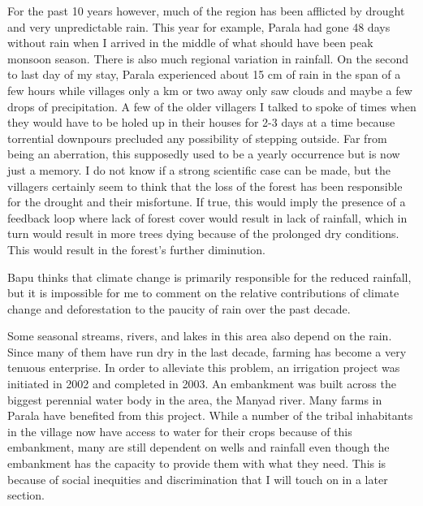 \documentclass{report}
\begin{document}
For the past 10 years however, much of the region has been afflicted by drought and very unpredictable rain. This year for example, Parala had gone 48 days without rain when I arrived in the middle of what should have been peak monsoon season. There is also much regional variation in rainfall. On the second to last day of my stay, Parala experienced about 15 cm of rain in the span of a few hours while villages only a km or two away only saw clouds and maybe a few drops of precipitation. A few of the older villagers I talked to spoke of times when they would have to be holed up in their houses for 2-3 days at a time because torrential downpours precluded any possibility of stepping outside. Far from being an aberration, this supposedly used to be a yearly occurrence but is now just a memory. I do not know if a strong scientific case can be made, but the villagers certainly seem to think that the loss of the forest has been responsible for the drought and their misfortune. If true, this would imply the presence of a feedback loop where lack of forest cover would result in lack of rainfall, which in turn would result in more trees dying because of the prolonged dry conditions. This would result in the forest's further diminution.

Bapu thinks that climate change is primarily responsible for the reduced rainfall, but it is impossible for me to comment on the relative contributions of climate change and deforestation to the paucity of rain over the past decade.

Some seasonal streams, rivers, and lakes in this area also depend on the rain. Since many of them have run dry in the last decade, farming has become a very tenuous enterprise. In order to alleviate this problem, an irrigation project was initiated in 2002 and completed in 2003. An embankment was built across the biggest perennial water body in the area, the Manyad river. Many farms in Parala have benefited from this project. While a number of the tribal inhabitants in the village now have access to water for their crops because of this embankment, many are still dependent on wells and rainfall even though the embankment has the capacity to provide them with what they need. This is because of social inequities and discrimination that I will touch on in a later section.

\newpage




\end{document}
